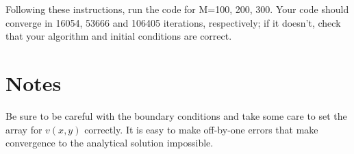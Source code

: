 \documentclass[12pt]{article}
\begin{document}
Following these instructions, run the code for M=100, 200, 300. Your code should converge in 16054, 53666 and 106405 iterations, respectively; if it doesn't, check that your algorithm and initial conditions are correct. 
\section{Notes}
Be sure to be careful with the boundary conditions and take some care to set the array for $v(x,y)$ correctly. It is easy to make off-by-one errors that make convergence to the analytical solution impossible.
\end{document}
